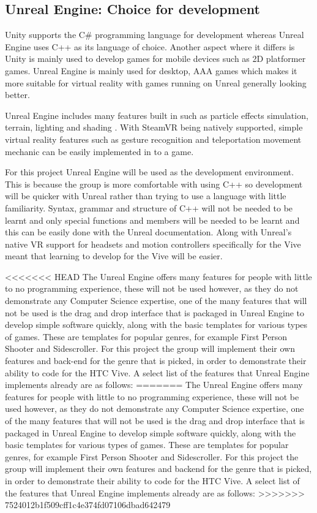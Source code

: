 \subsection{Unreal Engine: Choice for development}
Unity supports the C\# programming language for development whereas Unreal Engine uses C++ as its language of choice. Another aspect where it differs is Unity is mainly used to develop games for mobile devices such as 2D platformer games. Unreal Engine is mainly used for desktop, AAA games which makes it more suitable for virtual reality with games running on Unreal generally looking better.
\newline
\par
Unreal Engine includes many features built in such as particle effects simulation, terrain, lighting and shading \cite{unrealfeatures}. With SteamVR being natively supported, simple virtual reality features such as gesture recognition and teleportation movement mechanic can be easily implemented in to a game.
\newline
\par
For this project Unreal Engine will be used as the development environment. This is because the group is more comfortable with using C++ so development will be quicker with Unreal rather than trying to use a language with little familiarity. Syntax, grammar and structure of C++ will not be needed to be learnt and only special functions and members will be needed to be learnt and this can be easily done with the Unreal documentation. Along with Unreal's native VR support for headsets and motion controllers specifically for the Vive meant that learning to develop for the Vive will be easier.
\newline
\par
<<<<<<< HEAD
The Unreal Engine offers many features for people with little to no programming experience, these will not be used however, as they do not demonstrate any Computer Science expertise, one of the many features that will not be used is the drag and drop interface that is packaged in Unreal Engine to develop simple software quickly, along with the basic templates for various types of games. These are templates for popular genres, for example First Person Shooter and Sidescroller. For this project the group will implement their own features and back-end for the genre that is picked, in order to demonstrate their ability to code for the HTC Vive. A select list of the features that Unreal Engine implements already are as follows:
=======
The Unreal Engine offers many features for people with little to no programming experience, these will not be used however, as they do not demonstrate any Computer Science expertise, one of the many features that will not be used is the drag and drop interface that is packaged in Unreal Engine to develop simple software quickly, along with the basic templates for various types of games. These are templates for popular genres, for example First Person Shooter and Sidescroller. For this project the group will implement their own features and backend for the genre that is picked, in order to demonstrate their ability to code for the HTC Vive. A select list of the features that Unreal Engine implements already are as follows:
>>>>>>> 7524012b1f509cff1c4e374fd07106dbad642479

